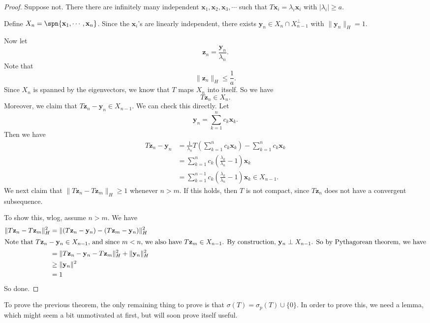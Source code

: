 \documentclass[a4paper]{article}
\begin{document}
\begin{proof}
  Suppose not. There there are infinitely many independent $\mathbf{x}_1, \mathbf{x}_2, \mathbf{x}_3, \cdots$ such that $T \mathbf{x}_i = \lambda_i \mathbf{x}_i$ with $|\lambda_i| \geq a$.

  Define $X_n = \spn\{\mathbf{x}_1, \cdots, \mathbf{x}_n\}$. Since the $\mathbf{x}_i$'s are linearly independent, there exists $\mathbf{y}_n \in X_n \cap X_{n - 1}^\perp$ with $\|\mathbf{y}_n\|_H = 1$.

  Now let
  \[
    \mathbf{z}_n = \frac{\mathbf{y}_n}{\lambda_n}.
  \]
  Note that
  \[
    \|\mathbf{z}_n\|_H \leq \frac{1}{a}.
  \]
  Since $X_n$ is spanned by the eigenvectors, we know that $T$ maps $X_n$ into itself. So we have
  \[
    T \mathbf{z}_n \in X_n.
  \]
  Moreover, we claim that $T \mathbf{z}_n - \mathbf{y}_n \in X_{n - 1}$. We can check this directly. Let
  \[
    \mathbf{y}_n = \sum_{k = 1}^n c_k \mathbf{x}_k.
  \]
  Then we have
  \begin{align*}
    T\mathbf{z}_n - \mathbf{y}_n &= \frac{1}{\lambda_n} T\left(\sum_{k = 1}^n c_k \mathbf{x}_k\right) - \sum_{k = 1}^n c_k \mathbf{x}_k\\
    &= \sum_{k = 1}^n c_k \left(\frac{\lambda_k}{\lambda_n} - 1\right) \mathbf{x}_k\\
    &= \sum_{k = 1}^{n - 1} c_k \left(\frac{\lambda_k}{\lambda_n} - 1\right) \mathbf{x}_k \in X_{n - 1}.
  \end{align*}
  We next claim that $\|T \mathbf{z}_n - T \mathbf{z}_m\|_H \geq 1$ whenever $n > m$. If this holds, then $T$ is not compact, since $T \mathbf{z}_n$ does not have a convergent subsequence.

  To show this, wlog, assume $n > m$. We have
  \begin{align*}
    \|T \mathbf{z}_n - T \mathbf{z}_m\|_H^2 &= \|(T \mathbf{z}_n - \mathbf{y}_n) - (T \mathbf{z}_m - \mathbf{y}_n)\|_H^2\\
    \intertext{Note that $T \mathbf{z}_n - \mathbf{y}_n \in X_{n - 1}$, and since $m < n$, we also have $T \mathbf{z}_m \in X_{n - 1}$. By construction, $\mathbf{y}_n \perp X_{n - 1}$. So by Pythagorean theorem, we have}
    &= \|T \mathbf{z}_n - \mathbf{y}_n - T \mathbf{z}_m\|_H^2 + \|\mathbf{y}_n\|_H^2\\
    &\geq \|\mathbf{y}_n\|^2\\
    &= 1
  \end{align*}
  So done.
\end{proof}

To prove the previous theorem, the only remaining thing to prove is that $\sigma(T) = \sigma_p(T) \cup \{0\}$. In order to prove this, we need a lemma, which might seem a bit unmotivated at first, but will soon prove itself useful.
\end{document}
